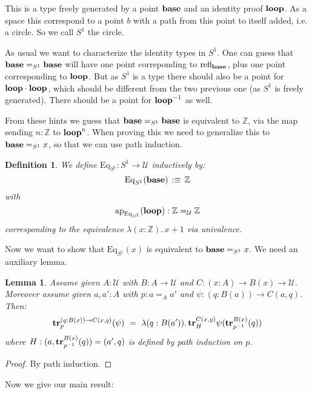 \documentclass{article}
\newcommand{\U}{{\mathcal U}}
\renewcommand{\r}{\rightarrow}
\newcommand{\Gl}{\lambda}
\newcommand{\ap}{\mathrm{ap}}
\newcommand{\refl}{\mathrm{refl}}
\newcommand{\tr}{\mathrm{\bf tr}}
\newcommand{\base}{\mathrm{\bf base}}
\renewcommand{\loop}{\mathrm{\bf loop}}
\newcommand{\Eq}{\mathrm{Eq}}
\newtheorem{lemma}{Lemma}
\newtheorem{definition}{Definition}
\begin{document}
This is a type freely generated by a point $\base$ and an identity proof $\loop$. As a space this correspond to a point $b$ with a path from this point to itself added, i.e. a circle. So we call $S^1$ the circle. 

As usual we want to characterize the identity types in $S^1$. One can guess that $\base=_{S^1}\base$ will have one point correponding to $\refl_\base$, plus one point corresponding to $\loop$. But as $S^1$ is a type there should also be a point for $\loop\cdot\loop$, which should be different from the two previous one (as $S^1$ is freely generated). There should be a point for $\loop^{-1}$ as well.

From these hints we guess that $\base=_{S^1}\base$ is equivalent to $\mathbb{Z}$, via the map sending $n:\mathbb{Z}$ to $\loop^n$. When proving this we need to generalize this to $\base=_{S^1}x$, so that we can use path induction.

\begin{definition}
We define $\Eq_{S^1} : S^1 \r \U$ inductively by:
\[\Eq_{S^1}(\base) \, :\equiv\, \mathbb{Z}\]
with 
\[\ap_{\Eq_{S^1}}(\loop) : \mathbb{Z}=_\U\mathbb{Z}\] 
corresponding to the equivalence $\Gl(x:\mathbb{Z}).\, x+1$ via univalence.
\end{definition} 

Now we want to show that $\Eq_{S^1}(x)$ is equivalent to $\base=_{S^1}x$. We need an auxiliary lemma.

\begin{lemma}
Assume given $A:\U$ with $B : A \r \U$ and $C:(x:A)\r B(x)\r \U$. Moreover assume given $a,a':A$ with $p:a=_Aa'$ and $\psi : (q:B(a))\r C(a,q)$. Then:
\[\tr^{(q:B(x))\r C(x,q)}_p(\psi) \ = \ \Gl(q:B(a')).\, \tr^{C(x,y)}_{H}\psi(\tr^{B(x)}_{p^{-1}}(q))\]
where $H:(a,\tr^{B(x)}_{p^{-1}}(q)) = (a',q)$ is defined by path induction on $p$.
\end{lemma}
\begin{proof}
By path induction.
\end{proof}

Now we give our main result:
\end{document}
